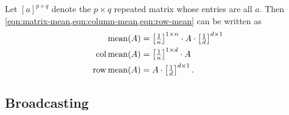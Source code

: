 \def\repmat#1#2{\textstyle\left[#1\right]^{#2}}
Let \([a]^{p \times q}\) denote the \(p \times q\) repeated matrix whose entries are all \(a\).
Then \cref{eqn:matrix-mean,eqn:column-mean,eqn:row-mean} can be written as
\begin{align}
    \mean(A) &= \repmat{\frac{1}{n}}{1 \times n} \cdot A \cdot \repmat{\frac{1}{d}}{d \times 1}\\
    \colmean(A) &= \repmat{\frac{1}{n}}{1 \times d} \cdot A \\
    \rowmean(A) &= A \cdot \repmat{\frac{1}{d}}{d \times 1}.
\end{align}


\subsection{Broadcasting}
\label{subsec:broadcasting}

